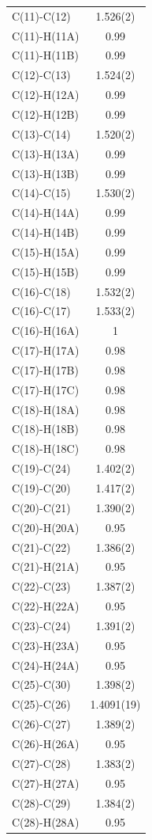 \begin{center}
{\begin{supertabular}{p{1.5in}c}
C(11)-C(12) &1.526(2)\\
C(11)-H(11A) &0.99\\
C(11)-H(11B) &0.99\\
C(12)-C(13) &1.524(2)\\
C(12)-H(12A) &0.99\\
C(12)-H(12B) &0.99\\
C(13)-C(14) &1.520(2)\\
C(13)-H(13A) &0.99\\
C(13)-H(13B) &0.99\\
C(14)-C(15) &1.530(2)\\
C(14)-H(14A) &0.99\\
C(14)-H(14B) &0.99\\
C(15)-H(15A) &0.99\\
C(15)-H(15B) &0.99\\
C(16)-C(18) &1.532(2)\\
C(16)-C(17) &1.533(2)\\
C(16)-H(16A) &1\\
C(17)-H(17A) &0.98\\
C(17)-H(17B) &0.98\\
C(17)-H(17C) &0.98\\
C(18)-H(18A) &0.98\\
C(18)-H(18B) &0.98\\
C(18)-H(18C) &0.98\\
C(19)-C(24) &1.402(2)\\
C(19)-C(20) &1.417(2)\\
C(20)-C(21) &1.390(2)\\
C(20)-H(20A) &0.95\\
C(21)-C(22) &1.386(2)\\
C(21)-H(21A) &0.95\\
C(22)-C(23) &1.387(2)\\
C(22)-H(22A) &0.95\\
C(23)-C(24) &1.391(2)\\
C(23)-H(23A) &0.95\\
C(24)-H(24A) &0.95\\
C(25)-C(30) &1.398(2)\\
C(25)-C(26) &1.4091(19)\\
C(26)-C(27) &1.389(2)\\
C(26)-H(26A) &0.95\\
C(27)-C(28) &1.383(2)\\
C(27)-H(27A) &0.95\\
C(28)-C(29) &1.384(2)\\
C(28)-H(28A) &0.95\\

\end{supertabular}}
\end{center}
